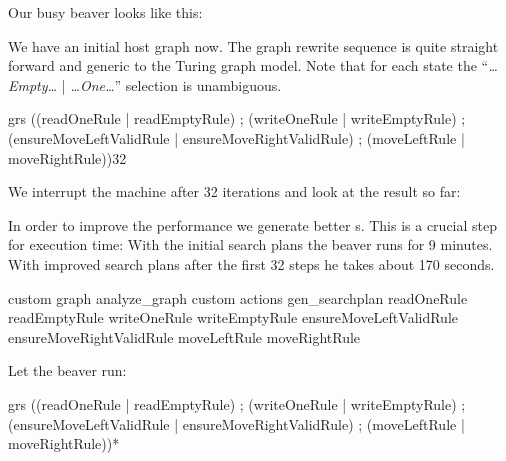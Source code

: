 Our busy beaver looks like this:
\begin{center}
\end{center}
We have an initial host graph now. The graph rewrite sequence is quite straight forward and generic to the Turing graph model. Note that for each state the ``\emph{\dots Empty\dots} | \emph{\dots One\dots}'' selection is unambiguous.
\clearpage
\begin{grshell}[firstnumber=last]
  grs ((readOneRule | readEmptyRule) ; (writeOneRule | writeEmptyRule) ; (ensureMoveLeftValidRule | ensureMoveRightValidRule) ; (moveLeftRule | moveRightRule)){32}

\end{grshell}
We interrupt the machine after 32 iterations and look at the result so far:
\begin{center}
\end{center}
In order to improve the performance we generate better s. This is a crucial step for execution time: With the initial search plans the beaver runs for 9 minutes. With improved search plans after the first 32 steps he takes about 170 seconds.
\begin{grshell}[firstnumber=last]
custom graph analyze_graph
custom actions gen_searchplan readOneRule readEmptyRule writeOneRule writeEmptyRule ensureMoveLeftValidRule ensureMoveRightValidRule moveLeftRule moveRightRule

\end{grshell}

Let the beaver run:
\begin{grshell}[firstnumber=last]
  grs ((readOneRule | readEmptyRule) ; (writeOneRule | writeEmptyRule) ; (ensureMoveLeftValidRule | ensureMoveRightValidRule) ; (moveLeftRule | moveRightRule))*
\end{grshell}

